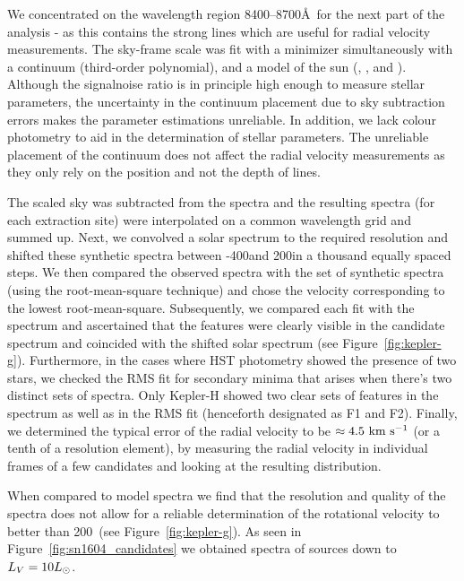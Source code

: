 \documentclass[preprint2]{aastex}
\begin{document}
We concentrated on the wavelength region 8400--8700\AA\ for the next part of the analysis - as this contains the strong  lines which are useful for radial velocity measurements. The sky-frame scale was fit with a minimizer \citep{powell1964efficient} simultaneously with a continuum (third-order polynomial), and a model of the sun (, , and ). Although the \gls{signalnoise} ratio is in principle high enough to measure stellar parameters, the uncertainty in the continuum placement due to sky
subtraction errors makes the parameter estimations unreliable. In addition, we lack colour photometry to aid in the determination of stellar parameters. The unreliable placement of the continuum does not affect the radial velocity measurements as they only rely on the position and not the depth of lines.

The scaled sky was subtracted from the spectra and the resulting spectra (for each extraction site) were interpolated on a common wavelength grid and summed up. Next, we convolved a solar spectrum to the required resolution and shifted these synthetic spectra between -400\kms and 200\kms in a thousand equally spaced steps. We then compared the observed spectra with the set of synthetic spectra (using the root-mean-square technique) and chose the velocity corresponding to the lowest root-mean-square. Subsequently, we compared each fit with the spectrum and ascertained that the  features were clearly visible in the candidate spectrum and coincided with the shifted solar spectrum (see Figure~\ref{fig:kepler-g}). Furthermore, in the cases where HST photometry showed the presence of two stars, we checked the RMS fit for secondary minima that arises when there's two distinct sets of spectra. Only Kepler-H showed two clear sets of  features in the spectrum as well as in the RMS fit (henceforth designated as F1 and F2). Finally, we determined the typical error of the radial velocity to be $\approx4.5~\textrm{km}~\textrm{s}^{-1}$  (or a tenth of a resolution element), by measuring the radial velocity in individual frames of a few candidates and looking at the resulting distribution. 

When compared to model spectra we find that the resolution and quality of the spectra does not allow for a reliable determination of the rotational velocity to better than 200~\kms (see Figure~\ref{fig:kepler-g}). 
As seen in Figure~\ref{fig:sn1604_candidates} we obtained spectra of sources down to $L_V = 10 \hbox{$L_{\odot}$}$.


\end{document}
